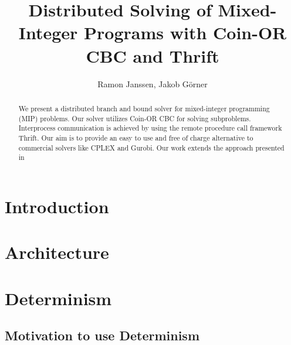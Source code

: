 \documentclass[sigconf]{acmart}
\begin{document}
\title{Distributed Solving of Mixed-Integer Programs with Coin-OR CBC and Thrift}

\author{Ramon Janssen, Jakob Görner}






\begin{abstract}
We present a distributed branch and bound solver for mixed-integer programming (MIP) problems. Our solver utilizes Coin-OR CBC for solving subproblems. Interprocess communication is achieved by using the remote procedure call framework Thrift. Our aim is to provide an easy to use and free of charge alternative to commercial solvers like CPLEX and Gurobi. Our work extends the approach presented in \cite{gurski2018distributed}
\end{abstract}

\maketitle
\pagestyle{plain}

\section{Introduction}

\section{Architecture}

\section{Determinism}

\subsection{Motivation to use Determinism}
\end{document}
